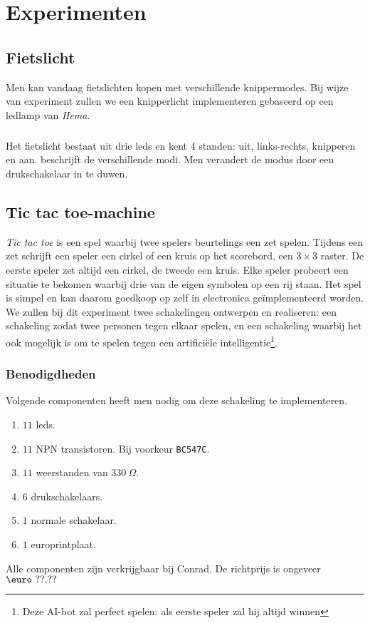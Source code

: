 \chapter{Experimenten}
\section{Fietslicht}
Men kan vandaag fietslichten kopen met verschillende knippermodes. Bij wijze van experiment zullen we een knipperlicht implementeren gebaseerd op een ledlamp van \emph{Hema}.
\paragraph{}
Het fietslicht bestaat uit drie leds en kent 4 standen: uit, links-rechts, knipperen en aan.  beschrijft de verschillende modi. Men verandert de modus door een drukschakelaar in te duwen.


\section{Tic tac toe-machine}
\emph{Tic tac toe} is een spel waarbij twee spelers beurtelings een zet spelen. Tijdens een zet schrijft een speler een cirkel of een kruis op het scorebord, een $3\times 3$ raster. De eerste speler zet altijd een cirkel, de tweede een kruis. Elke speler probeert een situatie te bekomen waarbij drie van de eigen symbolen op een rij staan. Het spel is simpel en kan daarom goedkoop op zelf in electronica ge\"implementeerd worden. We zullen bij dit experiment twee schakelingen ontwerpen en realiseren: een schakeling zodat twee personen tegen elkaar spelen, en een schakeling waarbij het ook mogelijk is om te spelen tegen een artifici\"ele intelligentie\footnote{Deze AI-bot zal perfect spelen: als eerste speler zal hij altijd winnen}.
\subsection{Benodigdheden}
Volgende componenten heeft men nodig om deze schakeling te implementeren.
\begin{enumerate}
 \item $11$ leds.
 \item $11$ NPN transistoren. Bij voorkeur \verb+BC547C+.
 \item $11$ weerstanden van $330\ \Omega$.
 \item $6$ drukschakelaars.
 \item $1$ normale schakelaar.
 \item $1$ europrintplaat.
\end{enumerate}
Alle componenten zijn verkrijgbaar bij Conrad. De richtprijs is ongeveer $\mbox{\euro}\ ??.??$
